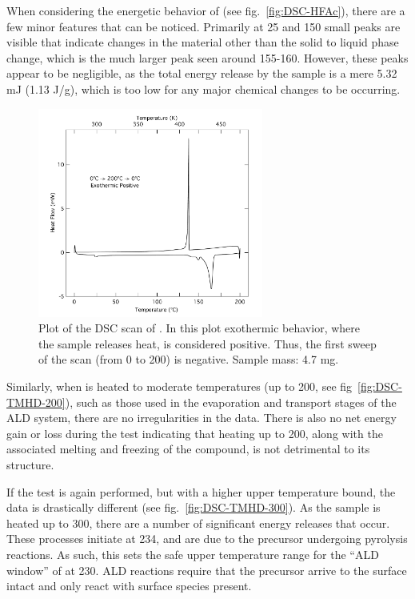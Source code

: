 When considering the energetic behavior of \HFAc{} (see fig.~\vref{fig:DSC-HFAc}), there are a few minor features that can be noticed. Primarily at 25 and 150\degC{} small peaks are visible that indicate changes in the material other than the solid to liquid phase change, which is the much larger peak seen around 155-160\degC{}. However, these peaks appear to be negligible, as the total energy release by the sample is a mere 5.32 mJ (1.13 J/g), which is too low for any major chemical changes to be occurring. 

\begin{figure}[htbp]
	\centering
	\includegraphics[width=0.66\textwidth]{./Figures/Data/Thermal-Analysis/DSC/HFAc}
	\caption[DSC Results of \HFAc{}]%
		{Plot of the DSC scan of \HFAc{}. In this plot exothermic behavior, where the sample releases heat, is %
		considered positive. Thus, the first sweep of the scan (from 0\degC{} to 200\degC{}) is negative. %
		Sample mass: 4.7 mg.}
	\label{fig:DSC-HFAc}
\end{figure}

Similarly, when \TMHD{} is heated to moderate temperatures (up to 200\degC{}, see fig~\vref{fig:DSC-TMHD-200}), such as those used in the evaporation and transport stages of the ALD system, there are no irregularities in the data. There is also no net energy gain or loss during the test indicating that heating up to 200\degC{}, along with the associated melting and freezing of the compound, is not detrimental to its structure. 

If the test is again performed, but with a higher upper temperature bound, the data is drastically different (see fig.~\vref{fig:DSC-TMHD-300}). As the sample is heated up to 300\degC{}, there are a number of significant energy releases that occur. These processes initiate at 234\degC{}, and are due to the precursor undergoing pyrolysis reactions. As such, this sets the safe upper temperature range for the ``ALD window'' of \TMHD{} at 230\degC{}. ALD reactions require that the precursor arrive to the surface intact and only react with surface species present. 

